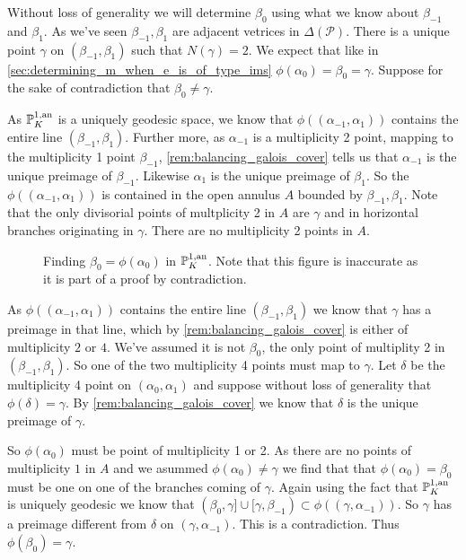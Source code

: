 \medskip

Without loss of generality we will determine $\beta_0$ using what we know about $\beta_{-1}$ and $\beta_1$. 
As we've seen $\beta_{-1}, \beta_{1}$ are adjacent vetrices in $\Delta(\mathscr P)$. 
There is a unique point $\gamma$ on $(\beta_{-1}, \beta_1)$ such that $N(\gamma) = 2$.  
We expect that like in \cref{sec:determining_m_when_e_is_of_type_ims} $\phi(\alpha_0) = \beta_0 = \gamma$. 
Suppose for the sake of contradiction that $\beta_0 \ne \gamma$.



As $\mathbb{P}^{1, \text{an}}_K$ is a uniquely geodesic space, we know that $\phi((\alpha_{-1}, \alpha_{1}))$ contains the entire line  $(\beta_{-1}, \beta_1)$. 
Further more, as $\alpha_{-1}$ is a multiplicity 2 point, mapping to the multiplicity 1 point $\beta_{-1}$, \cref{rem:balancing_galois_cover} tells us that $\alpha_{-1}$ is the unique preimage of $\beta_{-1}$. 
Likewise $\alpha_1$ is the unique preimage of $\beta_1$. 
So the $\phi((\alpha_{-1}, \alpha_{1}))$ is contained in the open annulus $A$ bounded by $\beta_{-1}, \beta_1$.
Note that the only divisorial points of multplicity 2 in $A$ are $\gamma$ and in horizontal branches originating in $\gamma$. There are no multiplicity 2 points in  $A$. 
\begin{figure}[ht]
    \centering
    \caption{Finding $\beta_0 = \phi(\alpha_0)$ in $\mathbb{P}^{1,\text{an}}_{K}$. 
    Note that this figure is inaccurate as it is part of a proof by contradiction.}
    \label{fig:argument_ims_wild}
\end{figure}
As $\phi((\alpha_{-1}, \alpha_{1}))$ contains the entire line $(\beta_{-1}, \beta_1)$ we know that $\gamma$ has a preimage in that line, which by \cref{rem:balancing_galois_cover} is either of multiplicity $2$ or $4$. 
We've assumed it is not $\beta_0$, the only point of multiplity 2 in  $(\beta_{-1}, \beta_1)$.
So one of the two multiplicity 4 points must map to $\gamma$. 
Let $\delta$ be the multiplicity 4 point on $(\alpha_0, \alpha_1)$ and suppose without loss of generality that $\phi(\delta) = \gamma$. 
By \cref{rem:balancing_galois_cover} we know that $\delta$ is the unique preimage of $\gamma$. 

So $\phi(\alpha_0)$ must be point of multiplicity 1 or 2. As there are no points of multiplicity $1$ in $A$ and we asummed $\phi(\alpha_0)\ne \gamma$ we find that that $\phi(\alpha_0) = \beta_0$ must be one on one of the branches coming of $\gamma$. 
Again using the fact that $\mathbb{P}^{1, \text{an}}_K$ is uniquely geodesic we know that $(\beta_0, \gamma] \cup [\gamma, \beta_{-1}) \subset  \phi((\gamma, \alpha_{-1}))$. 
So $\gamma$ has a preimage different from $\delta$ on $(\gamma, \alpha_{-1})$. 
This is a contradiction. 
Thus $\phi(\beta_0) = \gamma$. 


